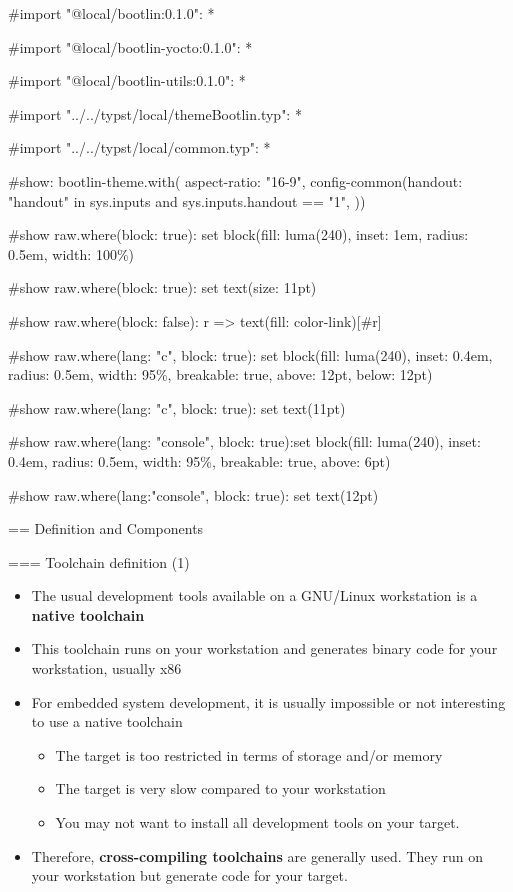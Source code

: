 #import "@local/bootlin:0.1.0": *

#import "@local/bootlin-yocto:0.1.0": *

#import "@local/bootlin-utils:0.1.0": *

#import "../../typst/local/themeBootlin.typ": *

#import "../../typst/local/common.typ": *

#show: bootlin-theme.with( aspect-ratio: "16-9", config-common(handout: "handout" in sys.inputs and sys.inputs.handout == "1", ))

#show raw.where(block: true): set block(fill: luma(240), inset: 1em, radius: 0.5em, width: 100\%)

#show raw.where(block: true): set text(size: 11pt)

#show raw.where(block: false): r => text(fill: color-link)[#r]

#show raw.where(lang: "c", block: true): set block(fill: luma(240), inset: 0.4em, radius: 0.5em, width: 95\%, breakable: true, above: 12pt, below: 12pt)

#show raw.where(lang: "c", block: true): set text(11pt)

#show raw.where(lang: "console", block: true):set block(fill: luma(240), inset: 0.4em, radius: 0.5em, width: 95\%, breakable: true, above: 6pt)

#show raw.where(lang:"console", block: true): set text(12pt)

 == Definition and Components

=== Toolchain definition (1)
  \begin{itemize}
  \item The usual development tools available on a GNU/Linux
    workstation is a {\bf native toolchain}
  \item This toolchain runs on your workstation and generates binary code for
    your workstation, usually x86
  \item For embedded system development, it is usually impossible or not
    interesting to use a native toolchain
    \begin{itemize}
    \item The target is too restricted in terms of storage and/or memory
    \item The target is very slow compared to your workstation
    \item You may not want to install all development tools on your target.
    \end{itemize}
  \item Therefore, {\bf cross-compiling toolchains} are generally
    used. They run on your workstation but generate code for your
    target.
  \end{itemize}


